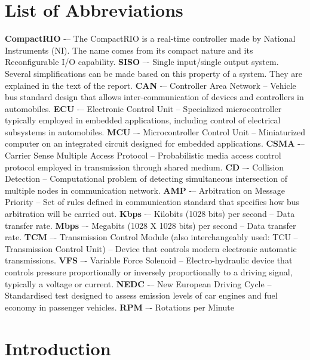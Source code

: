 \documentclass{article}
\begin{document}
\section{List of Abbreviations}
\begin{flushleft}
  \textbf{CompactRIO} -– The CompactRIO is a real-time controller made by National Instruments (NI). The name comes from its compact nature and its Reconfigurable I/O capability.
  \vskip0.5cm
  \textbf{SISO} –- Single input/single output system. Several simplifications can be made based on this property of a system. They are explained in the text of the report.
  \vskip0.5cm
  \textbf{CAN} -– Controller Area Network – Vehicle bus standard design that allows inter-communication of devices and controllers in automobiles.
  \vskip0.5cm
  \textbf{ECU} -– Electronic Control Unit – Specialized microcontroller typically employed in embedded applications, including control of electrical subsystems in automobiles.
  \vskip0.5cm
  \textbf{MCU} –- Microcontroller Control Unit – Miniaturized computer on an integrated circuit designed for embedded applications.
  \vskip0.5cm
  \textbf{CSMA} -– Carrier Sense Multiple Access Protocol – Probabilistic media access control protocol employed in transmission through shared medium.
  \vskip0.5cm
  \textbf{CD} –- Collision Detection – Computational problem of detecting simultaneous intersection of multiple nodes in communication network.
  \vskip0.5cm
  \textbf{AMP} -– Arbitration on Message Priority – Set of rules defined in communication standard that specifies how bus arbitration will be carried out.
  \vskip0.5cm
  \textbf{Kbps} -– Kilobits (1028 bits) per second – Data transfer rate.
  \vskip0.5cm
  \textbf{Mbps} –- Megabits (1028 X 1028 bits) per second – Data transfer rate.
  \vskip0.5cm
  \textbf{TCM} –- Transmission Control Module (also interchangeably used: TCU – Transmission Control Unit) – Device that controls modern electronic automatic transmissions.
  \vskip0.5cm
  \textbf{VFS} –- Variable Force Solenoid – Electro-hydraulic device that controls pressure proportionally or inversely proportionally to a driving signal, typically a voltage or current.
  \vskip0.5cm
  \textbf{NEDC} -– New European Driving Cycle – Standardised test designed to assess emission levels of car engines and fuel economy in passenger vehicles.
  \vskip0.5cm
  \textbf{RPM} –- Rotations per Minute
\end{flushleft}

\newpage
\section{Introduction}
\end{document}
